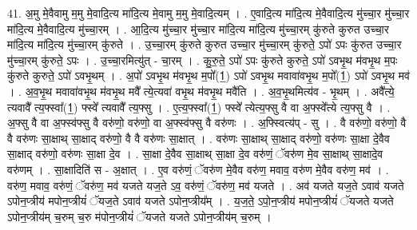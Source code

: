 \documentclass[17pt]{extarticle}
\begin{document}
41. अ॒मु मे॒वैवामु म॒मु मे॒वादि॒त्य मा॑दि॒त्य मे॒वामु म॒मु मे॒वादि॒त्यम् । . ए॒वादि॒त्य मा॑दि॒त्य मे॒वैवादि॒त्य मु॑च्चा॒र मु॑च्चा॒र मा॑दि॒त्य मे॒वैवादि॒त्य मु॑च्चा॒रम् । . आ॒दि॒त्य मु॑च्चा॒र मु॑च्चा॒र मा॑दि॒त्य मा॑दि॒त्य मु॑च्चा॒रम् कु॑रुते कुरुत उच्चा॒र मा॑दि॒त्य मा॑दि॒त्य मु॑च्चा॒रम् कु॑रुते । . उ॒च्चा॒रम् कु॑रुते कुरुत उच्चा॒र मु॑च्चा॒रम् कु॑रुते॒ ऽपो॑ ऽपः कु॑रुत उच्चा॒र मु॑च्चा॒रम् कु॑रुते॒ ऽपः । . उ॒च्चा॒रमित्यु॑त् - चा॒रम् । . कु॒रु॒ते॒ ऽपो॑ ऽपः कु॑रुते कुरुते॒ ऽपो॑ ऽवभृ॒थ म॑वभृ॒थ म॒पः कु॑रुते कुरुते॒ ऽपो॑ ऽवभृ॒थम् । . अ॒पो॑ ऽवभृ॒थ म॑वभृ॒थ म॒पो᳚(1॒) ऽपो॑ ऽवभृ॒थ मवावा॑वभृ॒थ म॒पो᳚(1॒) ऽपो॑ ऽवभृ॒थ मव॑ । . अ॒व॒भृ॒थ मवावा॑वभृ॒थ म॑वभृ॒थ मवै᳚ त्ये॒त्यवा॑ वभृ॒थ म॑वभृ॒थ मवै॑ति । . अ॒व॒भृ॒थमित्य॑व - भृ॒थम् । . अवै᳚त्ये॒ त्यवावै᳚ त्य॒फ्स्वा᳚(1॒) फ्स्वे᳚ त्यवावै᳚ त्य॒फ्सु । . ए॒त्य॒फ्स्वा᳚(1॒) फ्स्वे᳚ त्येत्य॒फ्सु वै वा अ॒फ्स्वे᳚त्ये त्य॒फ्सु वै । . अ॒फ्सु वै वा अ॒फ्स्व॑फ्सु वै वरु॑णो॒ वरु॑णो॒ वा अ॒फ्स्व॑फ्सु वै वरु॑णः । . अ॒फ्स्वित्य॑प् - सु । . वै वरु॑णो॒ वरु॑णो॒ वै वै वरु॑णः सा॒क्षाथ् सा॒क्षाद् वरु॑णो॒ वै वै वरु॑णः सा॒क्षात् । . वरु॑णः सा॒क्षाथ् सा॒क्षाद् वरु॑णो॒ वरु॑णः सा॒क्षा दे॒वैव सा॒क्षाद् वरु॑णो॒ वरु॑णः सा॒क्षा दे॒व । . सा॒क्षा दे॒वैव सा॒क्षाथ् सा॒क्षा दे॒व वरु॑णं॒ ॅवरु॑ण मे॒व सा॒क्षाथ् सा॒क्षादे॒व वरु॑णम् । . सा॒क्षादिति॑ स - अ॒क्षात् । . ए॒व वरु॑णं॒ ॅवरु॑ण मे॒वैव वरु॑ण॒ मवाव॒ वरु॑ण मे॒वैव वरु॑ण॒ मव॑ । . वरु॑ण॒ मवाव॒ वरु॑णं॒ ॅवरु॑ण॒ मव॑ यजते यज॒ते ऽव॒ वरु॑णं॒ ॅवरु॑ण॒ मव॑ यजते । . अव॑ यजते यज॒ते ऽवाव॑ यजते ऽपोन॒प्त्रीय॑ मपोन॒प्त्रीयं॑ ॅयज॒ते ऽवाव॑ यजते ऽपोन॒प्त्रीय᳚म् । . य॒ज॒ते॒ ऽपो॒न॒प्त्रीय॑ मपोन॒प्त्रीयं॑ ॅयजते यजते ऽपोन॒प्त्रीय॑म् च॒रुम् च॒रु म॑पोन॒प्त्रीयं॑ ॅयजते यजते ऽपोन॒प्त्रीय॑म् च॒रुम् । \newline
\end{document}
